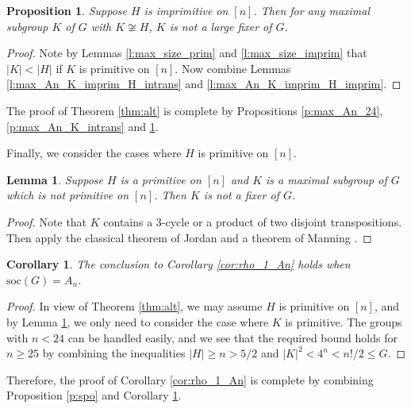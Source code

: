 \documentclass[twoside,a4paper,reqno,11pt]{amsart}
\newcommand{\<}{\langle}
\renewcommand{\>}{\rangle}
\newcommand{\leqs}{\leqslant}
\newcommand{\geqs}{\geqslant}
\newcommand{\soc}{\mathrm{soc}}
\newtheorem{prop}[thm]{Proposition}
\newtheorem{lem}[thm]{Lemma}
\newtheorem{cor}[thm]{Corollary}
\theoremstyle{definition}
\begin{document}
	\begin{prop}
		\label{p:max_An_K_imprim}
		Suppose $H$ is imprimitive on $[n]$. Then for any maximal subgroup $K$ of $G$ with $K\not\cong H$, $K$ is not a large fixer of $G$.
	\end{prop}
	
	\begin{proof}
		Note by Lemmas \ref{l:max_size_prim} and \ref{l:max_size_imprim} that $|K| < |H|$ if $K$ is primitive on $[n]$. Now combine Lemmas \ref{l:max_An_K_imprim_H_intrans} and \ref{l:max_An_K_imprim_H_imprim}.
	\end{proof}
	
	
	The proof of Theorem \ref{thm:alt} is complete by Propositions \ref{p:max_An_24}, \ref{p:max_An_K_intrans} and \ref{p:max_An_K_imprim}.
	
	
	
	Finally, we consider the cases where $H$ is primitive on $[n]$.
	
	\begin{lem}
		\label{l:max_H_prim_K_imprim}
		Suppose $H$ is a primitive on $[n]$ and $K$ is a maximal subgroup of $G$ which is not primitive on $[n]$. Then $K$ is not a fixer of $G$.
	\end{lem}
	
	\begin{proof}
		Note that $K$ contains a $3$-cycle or a product of two disjoint transpositions. Then apply the classical theorem of Jordan \cite{J_cycle} and a theorem of Manning \cite{M_transpo}.
	\end{proof}
	
	\begin{cor}
		\label{c:rho_1_An}
		The conclusion to Corollary \ref{cor:rho_1_An} holds when $\soc(G) = A_n$.
	\end{cor}
	
	\begin{proof}
		In view of Theorem \ref{thm:alt}, we may assume $H$ is primitive on $[n]$, and by Lemma \ref{l:max_H_prim_K_imprim}, we only need to consider the case where $K$ is primitive. The groups with $n < 24$ can be handled easily, and we see that the required bound holds for $n\geqs 25$ by combining the inequalities $|H|\geqs n > 5/2$ and $|K|^2 < 4^n  < n!/2\leqs G$.
	\end{proof}

Therefore, the proof of Corollary \ref{cor:rho_1_An} is complete by combining Proposition \ref{p:spo} and Corollary \ref{c:rho_1_An}.
	
\end{document}
